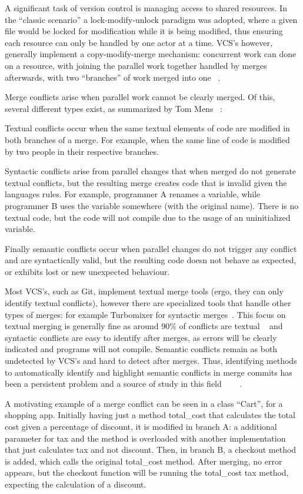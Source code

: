 A significant task of version control is managing access to shared resources.
In the ``classic scenario'' a lock-modify-unlock paradigm was adopted, where a given file would be locked for modification while it is being modified, thus ensuring each resource can only be handled by one actor at a time. VCS's however, generally implement a copy-modify-merge mechanism: concurrent work can done on a resource, with joining the parallel work together handled by merges afterwards, with two ``branches'' of work merged into one ~\citep{kn:vers_ott}.

Merge conflicts arise when parallel work cannot be clearly merged. Of this, several different types exist, as summarized by Tom Mens ~\citep{kn:tmens}:

Textual conflicts occur when the same textual elements of code are modified in both branches of a merge. For example, when the same line of code is modified by two people in their respective branches.

Syntactic conflicts arise from parallel changes that when merged do not generate textual conflicts, but the resulting merge creates code that is invalid given the languages rules. For example, programmer A renames a variable, while programmer B uses the variable somewhere (with the original name). There is no textual code, but the code will not compile due to the usage of an uninitialized variable.

Finally semantic conflicts occur when parallel changes do not trigger any conflict and are syntactically valid, but the resulting code doesn not behave as expected, or exhibits lost or new unexpected behaviour.

Most VCS's, such as Git, implement textual merge tools (ergo, they can only identify textual conflicts), however there are specialized tools that handle other types of merges: for example Turbomixer for syntactic merges~\citep{kn:tmens}. This focus on textual merging is generally fine as around 90\% of conflicts are textual ~\citep{kn:lcsd} and syntactic conflicts are easy to identify after merges, as errors will be clearly indicated and programs will not compile.
Semantic conflicts remain as both undetected by VCS's and hard to detect after merges. Thus, identifying methods to automatically identify and highlight semantic conflicts in merge commits has been a persistent problem and a source of study in this field~\citep{kn:nuno} ~\citep{kn:leuson} ~\citep{kn:leuson2}.


A motivating example of a merge conflict can be seen in a class ``Cart'', for a shopping app. Initially having just a method total\_cost that calculates the total cost given a percentage of discount, it is modified in branch A: a additional parameter for tax and the method is overloaded with another implementation that just calculates tax and not discount. Then, in branch B, a checkout method is added, which calls the original total\_cost method. After merging, no error appears, but the checkout function will be running the total\_cost tax method, expecting the calculation of a discount.

